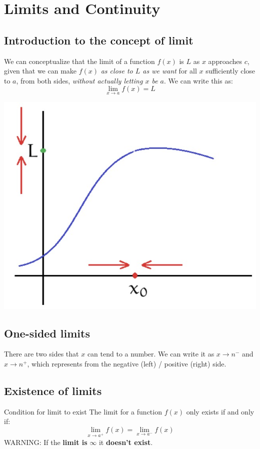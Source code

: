 
\section{Limits and Continuity}

\subsection{Introduction to the concept of limit}
\begin{minipage}{0.65\textwidth}
    We can conceptualize that the limit of a function $f(x)$ is $L$ as $x$ approaches $c$, given that we can make $f(x)$ \emph{as close to $L$ as we want} for all $x$ sufficiently close to $a$, from both sides, \emph{without actually letting $x$ be $a$}. We can write this as:
    \[\lim_{x\to a}f(x)=L\]
\end{minipage}
\hfill
\begin{minipage}{0.3\textwidth}
    \includegraphics[width=\textwidth]{img/Lim.jpg}
\end{minipage}

\subsection{One-sided limits}
There are two sides that $x$ can tend to a number. We can write it as $x\to n^-$ and $x\to n^+$, which represents from the negative (left) / positive (right) side.

\subsection{Existence of limits}
\begin{theorem}
    {Condition for limit to exist}
    The limit for a function $f(x)$ only exists if and only if:
    \[\lim_{x\to a^+}f(x)=\lim_{x\to a^-}f(x)\]
    WARNING: If the \textbf{limit is} $\mathbf{\infty}$ it \textbf{doesn't exist}.

\end{theorem}

